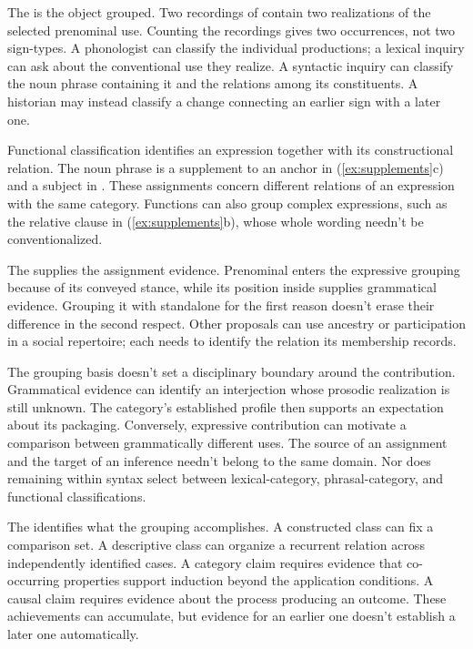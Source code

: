 \documentclass[12pt]{article}
\begin{document}
The  is the object grouped. Two recordings of  contain two realizations of the selected prenominal
 use. Counting the recordings gives two occurrences, not
two sign-types. A phonologist can classify the individual productions;
a lexical inquiry can ask about the conventional use they realize.
A syntactic inquiry can classify the noun phrase containing it and
the relations among its constituents. A historian may instead classify
a change connecting an earlier sign with a later one.

Functional classification identifies an expression together with its
constructional relation. The noun phrase  is a
supplement to an anchor in (\ref{ex:supplements}c) and a subject in
. These assignments
concern different relations of an expression with the same category.
Functions can also group complex expressions, such as the relative
clause in (\ref{ex:supplements}b), whose whole wording needn't be conventionalized.

The  supplies the assignment evidence. Prenominal
 enters the expressive grouping because of its conveyed
stance, while its position inside  supplies
grammatical evidence. Grouping it with standalone  for
the first reason doesn't erase their difference in the second respect.
Other proposals can use ancestry or participation in a social repertoire;
each needs to identify the relation its membership records.

The grouping basis doesn't set a disciplinary boundary around the
contribution. Grammatical evidence can identify an interjection whose
prosodic realization is still unknown. The category's established profile
then supports an expectation about its packaging. Conversely, expressive
contribution can motivate a comparison between grammatically different
 uses. The source of an assignment and the target
of an inference needn't belong to the same domain. Nor does
remaining within syntax select between lexical-category, phrasal-category,
and functional classifications.

The  identifies what the grouping accomplishes. A
constructed class can fix a comparison set. A descriptive class can
organize a recurrent relation across independently identified cases.
A category claim requires evidence that co-occurring properties support
induction beyond the application conditions. A causal claim requires
evidence about the process producing an outcome. These achievements
can accumulate, but evidence for an earlier one doesn't establish a
later one automatically.
\end{document}
